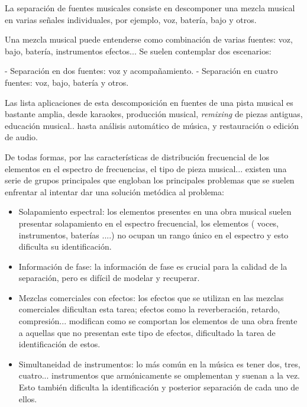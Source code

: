 La separación de fuentes musicales consiste en descomponer una mezcla musical en varias señales individuales, por ejemplo, voz, batería, bajo y otros.

Una mezcla musical puede entenderse como combinación de varias fuentes: voz, bajo, batería, instrumentos efectos... Se suelen contemplar dos escenarios:

- Separación en dos fuentes: voz y acompañamiento.
- Separación en cuatro fuentes: voz, bajo, batería y otros.

Las lista aplicaciones \cite{rafii18} de esta descomposición en fuentes de una pista musical es bastante amplia, desde karaokes, producción musical, \textit{remixing} de piezas antiguas, educación musical.. hasta análisis automático de música,  y restauración o edición de audio.

De todas formas, por las características de distribución frecuencial de los elementos en el espectro de frecuencias, el tipo de pieza musical... existen una serie de grupos principales que engloban los principales problemas que se suelen enfrentar \cite{sourceSepProblems} al intentar dar una solución metódica al problema:

\begin{itemize}
    \item Solapamiento espectral: los elementos presentes en una obra musical suelen presentar solapamiento en el espectro frecuencial, los elementos ( voces, instrumentos, baterías ....) no ocupan un rango único en el espectro y esto dificulta su identificación.
    \item Información de fase: la información de fase es crucial para la calidad de la separación, pero es difícil de modelar y recuperar.
    \item Mezclas comerciales con efectos: los efectos que se utilizan en las mezclas comerciales dificultan esta tarea; efectos como la reverberación, retardo, compresión... modifican como se comportan los elementos de una obra frente a aquellas que no presentan este tipo de efectos, dificultado la tarea de identificación de estos.
    \item Simultaneidad de instrumentos: lo más común en la música es tener dos, tres, cuatro... instrumentos que armónicamente se omplementan y suenan a la vez. Esto también dificulta la identificación y posterior separación de cada uno de ellos.
\end{itemize}

